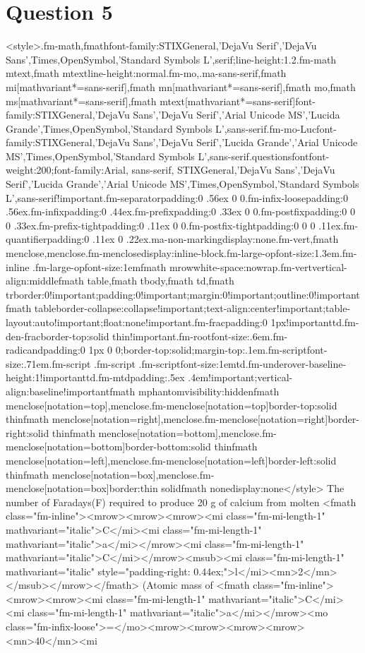 \documentclass{article}
\begin{document}
\section*{Question 5}
<style>.fm-math,fmath{font-family:STIXGeneral,'DejaVu Serif','DejaVu Sans',Times,OpenSymbol,'Standard Symbols L',serif;line-height:1.2}.fm-math mtext,fmath mtext{line-height:normal}.fm-mo,.ma-sans-serif,fmath mi[mathvariant*=sans-serif],fmath mn[mathvariant*=sans-serif],fmath mo,fmath ms[mathvariant*=sans-serif],fmath mtext[mathvariant*=sans-serif]{font-family:STIXGeneral,'DejaVu Sans','DejaVu Serif','Arial Unicode MS','Lucida Grande',Times,OpenSymbol,'Standard Symbols L',sans-serif}.fm-mo-Luc{font-family:STIXGeneral,'DejaVu Sans','DejaVu Serif','Lucida Grande','Arial Unicode MS',Times,OpenSymbol,'Standard Symbols L',sans-serif}.questionsfont{font-weight:200;font-family:Arial, sans-serif, STIXGeneral,'DejaVu Sans','DejaVu Serif','Lucida Grande','Arial Unicode MS',Times,OpenSymbol,'Standard Symbols L',sans-serif!important}.fm-separator{padding:0 .56ex 0 0}.fm-infix-loose{padding:0 .56ex}.fm-infix{padding:0 .44ex}.fm-prefix{padding:0 .33ex 0 0}.fm-postfix{padding:0 0 0 .33ex}.fm-prefix-tight{padding:0 .11ex 0 0}.fm-postfix-tight{padding:0 0 0 .11ex}.fm-quantifier{padding:0 .11ex 0 .22ex}.ma-non-marking{display:none}.fm-vert,fmath menclose,menclose.fm-menclose{display:inline-block}.fm-large-op{font-size:1.3em}.fm-inline .fm-large-op{font-size:1em}fmath mrow{white-space:nowrap}.fm-vert{vertical-align:middle}fmath table,fmath tbody,fmath td,fmath tr{border:0!important;padding:0!important;margin:0!important;outline:0!important}fmath table{border-collapse:collapse!important;text-align:center!important;table-layout:auto!important;float:none!important}.fm-frac{padding:0 1px!important}td.fm-den-frac{border-top:solid thin!important}.fm-root{font-size:.6em}.fm-radicand{padding:0 1px 0 0;border-top:solid;margin-top:.1em}.fm-script{font-size:.71em}.fm-script .fm-script .fm-script{font-size:1em}td.fm-underover-base{line-height:1!important}td.fm-mtd{padding:.5ex .4em!important;vertical-align:baseline!important}fmath mphantom{visibility:hidden}fmath menclose[notation=top],menclose.fm-menclose[notation=top]{border-top:solid thin}fmath menclose[notation=right],menclose.fm-menclose[notation=right]{border-right:solid thin}fmath menclose[notation=bottom],menclose.fm-menclose[notation=bottom]{border-bottom:solid thin}fmath menclose[notation=left],menclose.fm-menclose[notation=left]{border-left:solid thin}fmath menclose[notation=box],menclose.fm-menclose[notation=box]{border:thin solid}fmath none{display:none}</style> The number of Faradays(F) required to produce 20 g of calcium from molten <fmath class="fm-inline"><mrow><mrow><mrow><mi class="fm-mi-length-1" mathvariant="italic">C</mi><mi class="fm-mi-length-1" mathvariant="italic">a</mi></mrow><mi class="fm-mi-length-1" mathvariant="italic">C</mi></mrow><msub><mi class="fm-mi-length-1" mathvariant="italic" style="padding-right: 0.44ex;">l</mi><mn>2</mn></msub></mrow></fmath> (Atomic mass of <fmath class="fm-inline"><mrow><mrow><mi class="fm-mi-length-1" mathvariant="italic">C</mi><mi class="fm-mi-length-1" mathvariant="italic">a</mi></mrow><mo class="fm-infix-loose">=</mo><mrow><mrow><mrow><mrow><mn>40</mn><mi 
\end{document}
